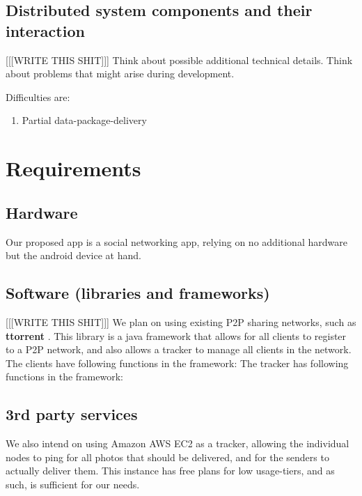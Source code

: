 \documentclass{report}
\begin{document}
\subsection{Distributed system components and their interaction}
[[[WRITE THIS SHIT]]]
Think about possible additional technical details.
Think about problems that might arise during development.

Difficulties are:
\begin{enumerate}
\item Partial data-package-delivery
\end{enumerate}



\section{Requirements}

\subsection{Hardware}
Our proposed app is a social networking app, relying on no additional hardware but the android device at hand.

\subsection{Software (libraries and frameworks)}
[[[WRITE THIS SHIT]]]
We plan on using existing P2P sharing networks, such as \textbf{ttorrent} \cite{ttorrentLink}.
This library is a java framework that allows for all clients to register to a P2P network, and also allows a tracker to manage all clients in the network.
The clients have following functions in the framework:
The tracker has following functions in the framework:

\subsection{3rd party services}
We also intend on using Amazon AWS EC2  as a tracker, allowing the individual nodes to ping for all photos that should be delivered, and for the senders to actually deliver them.
This instance has free plans for low usage-tiers, and as such, is sufficient for our needs.
\end{document}
